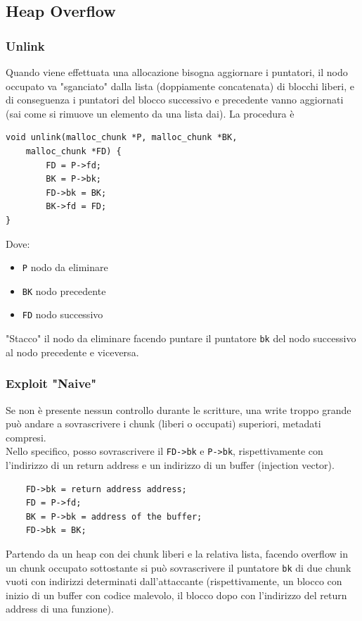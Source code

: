 \newpage

\subsection{Heap Overflow}

\subsubsection{Unlink}
Quando viene effettuata una allocazione bisogna aggiornare i puntatori, il nodo occupato va "sganciato" dalla lista (doppiamente concatenata) di blocchi liberi, e di conseguenza i puntatori del blocco successivo e precedente vanno aggiornati (sai come si rimuove un elemento da una lista dai). La procedura è
\begin{verbatim}
void unlink(malloc_chunk *P, malloc_chunk *BK, 
	malloc_chunk *FD) {
		FD = P->fd;
		BK = P->bk;
		FD->bk = BK;
		BK->fd = FD;
}
\end{verbatim}
Dove: 
\begin{itemize}
	\item \texttt{P} nodo da eliminare
	\item \texttt{BK} nodo precedente
	\item \texttt{FD} nodo successivo 
\end{itemize}
"Stacco" il nodo da eliminare facendo puntare il puntatore \texttt{bk} del nodo successivo al nodo precedente e viceversa.\\

\newpage

\subsubsection{Exploit "Naive"}
Se non è presente nessun controllo durante le scritture, una write troppo grande può andare a sovrascrivere i chunk (liberi o occupati) superiori, metadati compresi.\\

Nello specifico, posso sovrascrivere il \texttt{FD->bk} e \texttt{P->bk}, rispettivamente con l'indirizzo di un return address e un indirizzo di un buffer (injection vector).\\
\begin{verbatim}
	FD->bk = return address address;
	FD = P->fd;
	BK = P->bk = address of the buffer;
	FD->bk = BK;
\end{verbatim}

Partendo da un heap con dei chunk liberi e la relativa lista, facendo overflow in un chunk occupato sottostante si può sovrascrivere il puntatore \texttt{bk} di due chunk vuoti con indirizzi determinati dall'attaccante (rispettivamente, un blocco con inizio di un buffer con codice malevolo, il blocco dopo con l'indirizzo del return address di una funzione).\\

